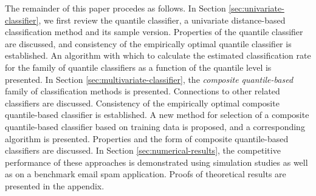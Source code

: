 The remainder of this paper procedes as follows.  In Section
\ref{sec:univariate-classifier}, we first review the quantile classifier, a
univariate distance-based classification method and its sample version.
Properties of the quantile classifier are discussed, and consistency of the
empirically optimal quantile classifier is established.  An algorithm with which
to calculate the estimated classification rate for the family of quantile
classifiers as a function of the quantile level is presented.  In Section
\ref{sec:multivariate-classifier}, the \emph{composite quantile-based} family of
classification methods is presented.  Connections to other related classifiers
are discussed.  Consistency of the empirically optimal composite quantile-based
classifier is established.  A new method for selection of a composite
quantile-based classifier based on training data is proposed, and a
corresponding algorithm is presented.  Properties and the form of composite
quantile-based classifiers are discussed.  In Section
\ref{sec:numerical-results}, the competitive performance of these approaches is
demonstrated using simulation studies as well as on a benchmark email spam
application.  Proofs of theoretical results are presented in the appendix.




